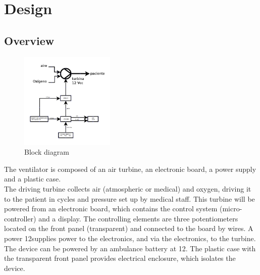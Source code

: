 \section{Design}
\subsection{Overview}
    \begin{figure}%
        \centering
        \includegraphics[width=0.4\textwidth]{Img/Bloques.PNG}
        \caption{Block diagram}
    \end{figure}
    The ventilator is composed of an air turbine, an electronic board, a power supply and a plastic case.\\
    
    The driving turbine collects air (atmospheric or medical) and oxygen, driving it to the patient in cycles and pressure set up by medical staff. This turbine will be powered from an electronic board, which contains the control system (micro-controller) and a display. The controlling elements are three potentiometers located on the front panel (transparent) and connected to the board by wires. A power 12\Vcc supplies power to the electronics, and via the electronics, to the turbine. The device can be powered by an ambulance battery at 12\Vcc. The plastic case with the transparent front panel provides electrical enclosure, which isolates the device.
    
    
